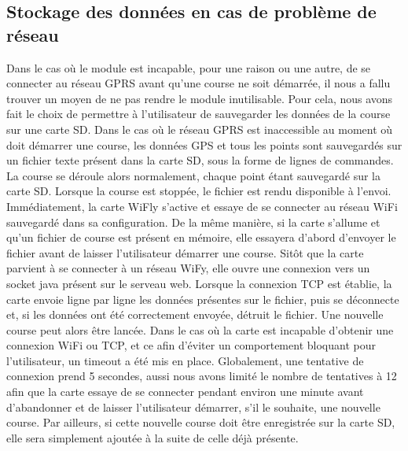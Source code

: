 \documentclass[a4paper,11pt]{article}
\begin{document}
\subsection{Stockage des données en cas de problème de réseau}
Dans le cas où le module est incapable, pour une raison ou une autre, de se connecter au réseau GPRS avant qu'une course ne soit démarrée, il nous a fallu trouver un moyen de ne pas rendre le module inutilisable. Pour cela, nous avons fait le choix de permettre à l'utilisateur de sauvegarder les données de la course sur une carte SD.\newline
Dans le cas où le réseau GPRS est inaccessible au moment où doit démarrer une course, les données GPS et tous les points sont sauvegardés sur un fichier texte présent dans la carte SD, sous la forme de lignes de commandes. La course se déroule alors normalement, chaque point étant sauvegardé sur la carte SD.\newline
Lorsque la course est stoppée, le fichier est rendu disponible à l'envoi. Immédiatement, la carte WiFly s'active et essaye de se connecter au réseau WiFi sauvegardé dans sa configuration. De la même manière, si la carte s'allume et qu'un fichier de course est présent en mémoire, elle essayera d'abord d'envoyer le fichier avant de laisser l'utilisateur démarrer une course.\newline
Sitôt que la carte parvient à se connecter à un réseau WiFy, elle ouvre une connexion vers un socket java présent sur le serveau web. Lorsque la connexion TCP est établie, la carte envoie ligne par ligne les données présentes sur le fichier, puis se déconnecte et, si les données ont été correctement envoyée, détruit le fichier. Une nouvelle course peut alors être lancée.\newline
Dans le cas où la carte est incapable d'obtenir une connexion WiFi ou TCP, et ce afin d'éviter un comportement bloquant pour l'utilisateur, un timeout a été mis en place. Globalement, une tentative de connexion prend 5 secondes, aussi nous avons limité le nombre de tentatives à 12 afin que la carte essaye de se connecter pendant environ une minute avant d'abandonner et de laisser l'utilisateur démarrer, s'il le souhaite, une nouvelle course. Par ailleurs, si cette nouvelle course doit être enregistrée sur la carte SD, elle sera simplement ajoutée à la suite de celle déjà présente.\newline
\end{document}
